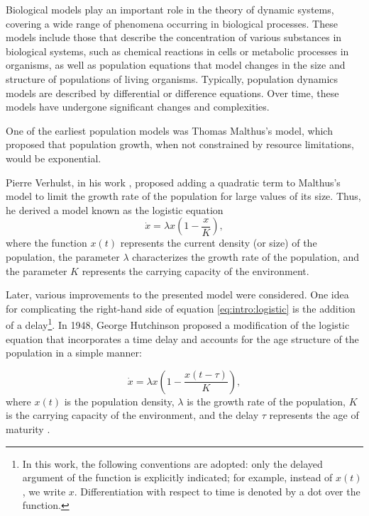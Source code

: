 
{\actuality} Biological models play an important role in the theory of dynamic systems, covering a wide range of phenomena occurring in biological processes. These models include those that describe the concentration of various substances in biological systems, such as chemical reactions in cells or metabolic processes in organisms, as well as population equations that model changes in the size and structure of populations of living organisms. Typically, population dynamics models are described by differential or difference equations. Over time, these models have undergone significant changes and complexities.

One of the earliest population models was Thomas Malthus's model, which proposed that population growth, when not constrained by resource limitations, would be exponential.

Pierre Verhulst, in his work \cite{Verhulst1838}, proposed adding a quadratic term to Malthus's model to limit the growth rate of the population for large values of its size. Thus, he derived a model known as the logistic equation
\begin{equation}
\label{eq:intro:logistic}
	\dot{x}=\lambda x\left(1-\frac{x}{K}\right),
\end{equation}
where the function $x(t)$ represents the current density (or size) of the population, the parameter $\lambda$ characterizes the growth rate of the population, and the parameter $K$ represents the carrying capacity of the environment.

Later, various improvements to the presented model were considered. One idea for complicating the right-hand side of equation \eqref{eq:intro:logistic} is the addition of a delay\footnote{In this work, the following conventions are adopted: only the delayed argument of the function is explicitly indicated; for example, instead of $x(t)$, we write $x$. Differentiation with respect to time is denoted by a dot over the function.}. In 1948, George Hutchinson proposed a modification of the logistic equation that incorporates a time delay and accounts for the age structure of the population in a simple manner:

\begin{equation}
	\label{eq:intro:hutch}
	\dot{x} = \lambda x\left(1 - \frac{x(t - \tau)}{K}\right),
\end{equation}
%
where $x(t)$ is the population density, $\lambda$ is the growth rate of the population, $K$ is the carrying capacity of the environment, and the delay $\tau$ represents the age of maturity \cite{Hutchinson1948}. %



